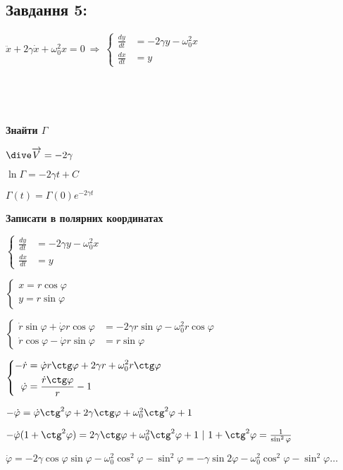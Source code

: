 \subsection*{Завдання 5:}

$\ddot{x} + 2\gamma\dot{x}+\omega_0^2x = 0 \ \Longrightarrow \ 
\left\{\begin{aligned}
    \frac{dy}{dt} &= -2\gamma y -\omega_0^2x\\
    \frac{dx}{dt} &= y 
\end{aligned}\right.$

\begin{figure}[h]
    \begin{minipage}[h]{0.49\linewidth}
         \\
    \end{minipage}
    \begin{minipage}[h]{0.49\linewidth}
         \\
    \end{minipage}
\end{figure}

\textbf{Знайти $\Gamma$}

$\dive \overrightarrow{V} = -2\gamma$

$\ln \Gamma = -2\gamma t + C$

$\Gamma(t) = \Gamma(0)e^{-2\gamma t}$

\textbf{Записати в полярних координатах}

$\left\{\begin{aligned}
    \frac{dy}{dt} &= -2\gamma y -\omega_0^2x\\
    \frac{dx}{dt} &= y 
\end{aligned}\right.$

$\left\{\begin{aligned}
    x = r\cos \varphi \\
    y = r\sin \varphi 
\end{aligned}\right.$

$\left\{\begin{aligned}
    \dot{r}\sin \varphi + \dot{\varphi}r \cos \varphi &=  -2\gamma r\sin \varphi - \omega_0^2 r\cos \varphi\\
    \dot{r}\cos \varphi - \dot{\varphi} r \sin \varphi &= r \sin \varphi
\end{aligned}\right.$

$\left\{\begin{aligned}
    -\dot{r} &= \dot{\varphi}r\ctg \varphi + 2\gamma r + \omega_0^2 r \ctg \varphi \\
    \dot{\varphi} &= \frac{\dot{r}\ctg \varphi }{r} - 1
\end{aligned}\right.$

$-\dot{\varphi} = \dot{\varphi} \ctg^2 \varphi + 2\gamma\ctg \varphi + \omega_0^2 \ctg^2 \varphi + 1$

$-\dot{\varphi}(1 + \ctg^2\varphi) =  2\gamma\ctg \varphi + \omega_0^2 \ctg^2\varphi + 1\ | \ 1+\ctg^2\varphi = \frac{1}{\sin^2\varphi}$ 

$\dot{\varphi} = -2\gamma\cos\varphi\sin\varphi - \omega^2_0\cos^2\varphi - \sin^2\varphi= 
-\gamma\sin 2\varphi - \omega_0^2\cos^2\varphi - \sin^2\varphi \ldots$